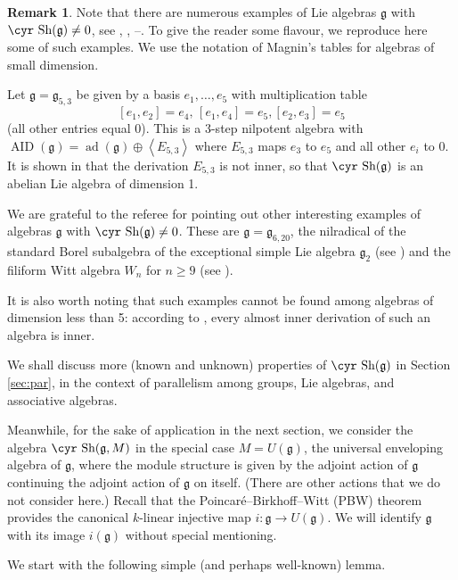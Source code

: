 \documentclass[11pt,reqno]{amsart}
\numberwithin{equation}{section}
\theoremstyle{definition}
\newtheorem{remark}[theorem]{Remark}
\newcommand{\AID}{{\operatorname{ AID}}}
\newcommand{\ad}{{\operatorname{ ad}}}
\def\Sha{\text{\cyr Sh}}
\def\g{\mathfrak g}
\begin{document}
\begin{remark} \label{nonzero}
Note that there are numerous examples of Lie algebras $\g$ with $\Sha (\g)\ne 0$, see
\cite{GW}, \cite{SMSB}, \cite{BDV1}--\cite{BDV3}. To give the reader some flavour, we
reproduce here some of such examples. We use the notation of Magnin's tables \cite{Ma}
for algebras of small dimension.

Let $\g =\g_{5,3}$ be given by a basis $e_1,\dots ,e_5$ with multiplication table
$$
[e_1,e_2] = e_4, \, [e_1,e_4] = e_5, [e_2,e_3] = e_5
$$
(all other entries equal 0). This is a 3-step nilpotent algebra with $\AID (\g)=\ad (\g) \oplus
\left<E_{5,3}\right>$ where $E_{5,3}$ maps $e_3$ to $e_5$ and all other $e_i$ to 0. It is shown in
\cite[Example 2.7]{BDV1} that the derivation $E_{5,3}$ is not inner, so that $\Sha (\g)$ is
an abelian Lie algebra of dimension 1.

We are grateful to the referee for pointing out other interesting examples of algebras $\g$ with
$\Sha (\g)\ne 0$. These are $\g =\g_{6,20}$, the nilradical of the
standard Borel subalgebra of the exceptional simple Lie algebra $\g_2$ (see \cite[Remark~8.6]{BDV1})
and the filiform Witt algebra $W_n$ for $n\ge 9$ (see \cite[Proposition~4.5]{BDV2}).

It is also worth noting that such examples cannot be found among algebras of dimension less than 5:
according to \cite[Proposition~2.8]{BDV1}, every almost inner derivation of such an algebra is inner.
\end{remark}



We shall discuss more (known and unknown) properties of $\Sha (\g)$ in Section \ref{sec:par},
in the context of parallelism among groups, Lie algebras, and associative algebras.

\medskip

Meanwhile, for the sake of application in the next section, we consider the algebra
$\Sha (\g, M)$ in the special case
$M=U(\g)$, the universal enveloping algebra of $\g$,
where the module structure is given by the adjoint action of $\g$
continuing the adjoint action of $\g$ on itself. (There are other actions
that we do not consider here.) Recall that the Poincar\'e--Birkhoff--Witt
(PBW) theorem provides the canonical $k$-linear injective map $i\colon \g\to U(\g )$.
We will identify $\g$ with its image $i(\g )$ without special mentioning.

We start with the following simple (and perhaps well-known) lemma.
\end{document}
